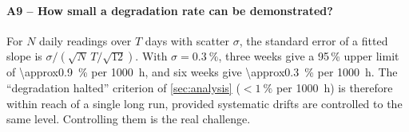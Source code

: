 \paragraph{A9 -- How small a degradation rate can be demonstrated?} For $N$ daily readings over $T$ days
with scatter $\sigma$, the standard error of a fitted slope is $\sigma/(\sqrt{N}\,T/\sqrt{12})$. With
$\sigma=\SI{0.3}{\percent}$, three weeks give a 95\,\% upper limit of \SI{\approx0.9}{\percent} per
\SI{1000}{h}, and six weeks give \SI{\approx0.3}{\percent} per \SI{1000}{h}. The ``degradation
halted'' criterion of \cref{sec:analysis} ($<\SI{1}{\percent}$ per \SI{1000}{h}) is therefore within
reach of a single long run, provided systematic drifts are controlled to the same level. Controlling
them is the real challenge.
